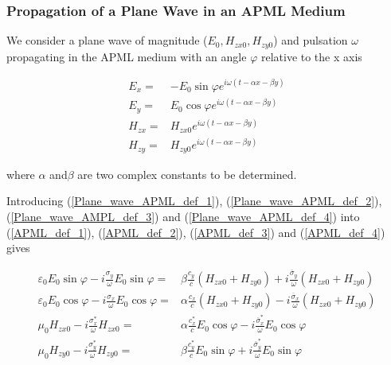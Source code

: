 \subsubsection{\label{Sec:analytic theory, propa plane wave}Propagation of a Plane Wave in an APML Medium}

We consider a plane wave of magnitude ($ E_{0},H_{zx0},H_{zy0} $)
and pulsation $\omega$ propagating in the APML medium with an
angle $\varphi$ relative to the x axis

\begin{eqnarray}
E_{x} = & -E_{0}\sin \varphi e^{i\omega \left( t-\alpha x-\beta y\right) }\label{Plane_wave_APML_def_1} \\
E_{y} = & E_{0}\cos \varphi e^{i\omega \left( t-\alpha x-\beta y\right) }\label{Plane_wave_APML_def_2} \\
H_{zx} = & H_{zx0}e^{i\omega \left( t-\alpha x-\beta y\right) }\label{Plane_wave_AMPL_def_3} \\
H_{zy} = & H_{zy0}e^{i\omega \left( t-\alpha x-\beta y\right) }\label{Plane_wave_APML_def_4} 
\end{eqnarray}


where $\alpha$ and$\beta$ are two complex constants to
be determined.

Introducing (\ref{Plane_wave_APML_def_1}), (\ref{Plane_wave_APML_def_2}),
(\ref{Plane_wave_AMPL_def_3}) and (\ref{Plane_wave_APML_def_4})
into (\ref{APML_def_1}), (\ref{APML_def_2}), (\ref{APML_def_3})
and (\ref{APML_def_4}) gives

\begin{eqnarray}
\varepsilon _{0}E_{0}\sin \varphi -i\frac{\sigma _{y}}{\omega }E_{0}\sin \varphi  = & \beta \frac{c_{y}}{c}\left( H_{zx0}+H_{zy0}\right) +i\frac{\overline{\sigma }_{y}}{\omega }\left( H_{zx0}+H_{zy0}\right) \label{Plane_wave_APML_1_1} \\
\varepsilon _{0}E_{0}\cos \varphi -i\frac{\sigma _{x}}{\omega }E_{0}\cos \varphi  = & \alpha \frac{c_{x}}{c}\left( H_{zx0}+H_{zy0}\right) -i\frac{\overline{\sigma }_{x}}{\omega }\left( H_{zx0}+H_{zy0}\right) \label{Plane_wave_APML_1_2} \\
\mu _{0}H_{zx0}-i\frac{\sigma ^{*}_{x}}{\omega }H_{zx0} = & \alpha \frac{c^{*}_{x}}{c}E_{0}\cos \varphi -i\frac{\overline{\sigma }^{*}_{x}}{\omega }E_{0}\cos \varphi \label{Plane_wave_APML_1_3} \\
\mu _{0}H_{zy0}-i\frac{\sigma ^{*}_{y}}{\omega }H_{zy0} = & \beta \frac{c^{*}_{y}}{c}E_{0}\sin \varphi +i\frac{\overline{\sigma }^{*}_{y}}{\omega }E_{0}\sin \varphi \label{Plane_wave_APML_1_4} 
\end{eqnarray}


